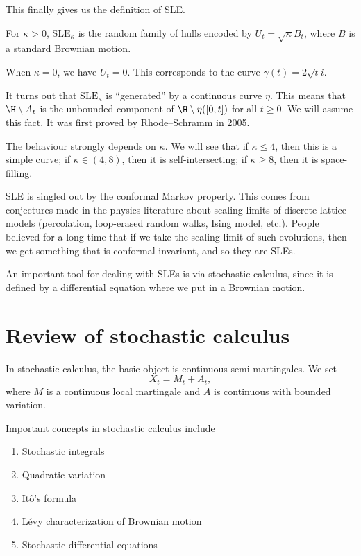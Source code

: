 \documentclass[a4paper]{article}
\newcommand\SLE{\mathrm{SLE}}
\begin{document}
This finally gives us the definition of SLE.
\begin{defi}
  For $\kappa > 0$, $\SLE_\kappa$ is the random family of hulls encoded by $U_t = \sqrt{\kappa} B_t$, where $B$ is a standard Brownian motion.
\end{defi}
When $\kappa = 0$, we have $U_t = 0$. This corresponds to the curve $\gamma(t) = 2 \sqrt{t} i$.

It turns out that $\SLE_\kappa$ is ``generated'' by a continuous curve $\eta$. This means that $\H \setminus A_t$ is the unbounded component of $\H \setminus \eta([0, t])$ for all $t \geq 0$. We will assume this fact. It was first proved by Rhode--Schramm in 2005.

The behaviour strongly depends on $\kappa$. We will see that if $\kappa \leq 4$, then this is a simple curve; if $\kappa \in (4, 8)$, then it is self-intersecting; if $\kappa \geq 8$, then it is space-filling.

SLE is singled out by the conformal Markov property. This comes from conjectures made in the physics literature about scaling limits of discrete lattice models (percolation, loop-erased random walks, Ising model, etc.). People believed for a long time that if we take the scaling limit of such evolutions, then we get something that is conformal invariant, and so they are SLEs.

An important tool for dealing with SLEs is via stochastic calculus, since it is defined by a differential equation where we put in a Brownian motion.

\section{Review of stochastic calculus}
In stochastic calculus, the basic object is continuous semi-martingales. We set
\[
  X_t = M_t + A_t,
\]
where $M$ is a continuous local martingale and $A$ is continuous with bounded variation.

Important concepts in stochastic calculus include
\begin{enumerate}
  \item Stochastic integrals
  \item Quadratic variation
  \item It\^o's formula
  \item L\'evy characterization of Brownian motion
  \item Stochastic differential equations
\end{enumerate}
\end{document}
